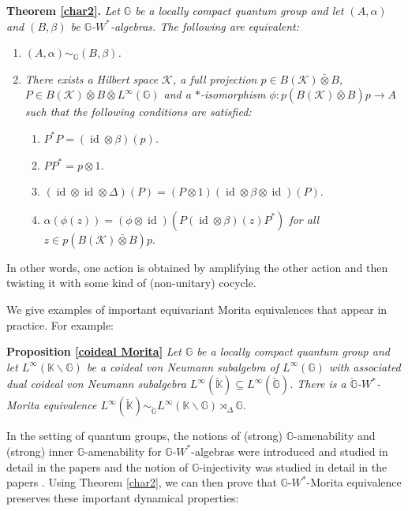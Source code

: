 \documentclass[reqno]{amsart}
\numberwithin{equation}{section}
\DeclareMathOperator{\id}{\mathrm{id}}
\newcommand{\G}{\mathbb{G}}
\newcommand{\ovot}{\bar{\otimes}}
\begin{document}
\textbf{Theorem \ref{char2}.}\textit{ Let $\G$ be a locally compact quantum group and let $(A, \alpha)$ and $(B, \beta)$ be $\G$-$W^*$-algebras. The following are equivalent:}
      \begin{enumerate}\setlength\itemsep{-0.5em}
        \item \textit{$(A, \alpha)\sim_\G (B, \beta)$.}
        \item \textit{There exists a Hilbert space $\mathcal{K}$, a full projection $p\in B(\mathcal{K})\ovot B$, $P\in B(\mathcal{K})\ovot B \ovot L^\infty(\G)$ and a $*$-isomorphism $\phi: p(B(\mathcal{K})\ovot B)p\to A$ such that the following conditions are satisfied:}
            \begin{enumerate}\setlength\itemsep{-0.5em}
        \item \textit{$P^*P=(\id \otimes \beta)(p)$.}
        \item \textit{$PP^* = p\otimes 1$.}
        \item \textit{$(\id \otimes \id \otimes \Delta)(P) = (P\otimes 1)(\id \otimes \beta \otimes \id)(P).$}
        \item \textit{$\alpha(\phi(z)) = (\phi\otimes \id)(P(\id \otimes \beta)(z)P^*)$ for all $z\in p(B(\mathcal{K})\ovot B)p.$}
    \end{enumerate}
    \end{enumerate}

In other words, one action is obtained by amplifying the other action and then twisting it with some kind of (non-unitary) cocycle.

We give examples of important equivariant Morita equivalences that appear in practice. For example:

\textbf{Proposition \ref{coideal Morita}}\textit{ Let $\G$ be a locally compact quantum group and let $L^\infty(\mathbb{K}\backslash \G)$ be a coideal von Neumann subalgebra of $L^\infty(\G)$ with associated dual coideal von Neumann subalgebra $L^\infty(\check{\mathbb{K}})\subseteq L^\infty(\check{\mathbb{G}})$. There is a $\check{\G}$-$W^*$-Morita equivalence $L^\infty(\check{\mathbb{K}}) \sim_{\check{\G}} L^\infty(\mathbb{K}\backslash \G)\rtimes_\Delta \G.$}

In the setting of quantum groups, the notions of (strong) $\G$-amenability and (strong) inner $\G$-amenability for $\G$-$W^*$-algebras were introduced and studied in detail in the papers \cites{Moa18, DCDR24a, DCDR24b, DR24a} and the notion of $\G$-injectivity was studied in detail in the papers \cites{CN16, Cr17a, DR24a}. Using Theorem \ref{char2}, we can then prove that $\G$-$W^*$-Morita equivalence preserves these important dynamical properties:
\end{document}
